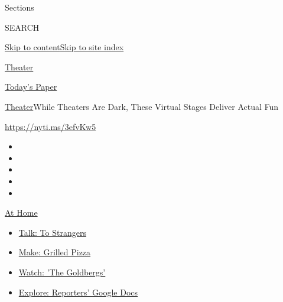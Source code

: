 Sections

SEARCH

\protect\hyperlink{site-content}{Skip to
content}\protect\hyperlink{site-index}{Skip to site index}

\href{https://www.nytimes3xbfgragh.onion/section/theater}{Theater}

\href{https://myaccount.nytimes3xbfgragh.onion/auth/login?response_type=cookie\&client_id=vi}{}

\href{https://www.nytimes3xbfgragh.onion/section/todayspaper}{Today's
Paper}

\href{/section/theater}{Theater}\textbar{}While Theaters Are Dark, These
Virtual Stages Deliver Actual Fun

\url{https://nyti.ms/3efvKw5}

\begin{itemize}
\item
\item
\item
\item
\item
\end{itemize}

\href{https://www.nytimes3xbfgragh.onion/spotlight/at-home?action=click\&pgtype=Article\&state=default\&region=TOP_BANNER\&context=at_home_menu}{At
Home}

\begin{itemize}
\tightlist
\item
  \href{https://www.nytimes3xbfgragh.onion/2020/08/03/well/family/the-benefits-of-talking-to-strangers.html?action=click\&pgtype=Article\&state=default\&region=TOP_BANNER\&context=at_home_menu}{Talk:
  To Strangers}
\item
  \href{https://www.nytimes3xbfgragh.onion/2020/08/01/at-home/coronavirus-make-pizza-on-a-grill.html?action=click\&pgtype=Article\&state=default\&region=TOP_BANNER\&context=at_home_menu}{Make:
  Grilled Pizza}
\item
  \href{https://www.nytimes3xbfgragh.onion/2020/07/31/arts/television/goldbergs-abc-stream.html?action=click\&pgtype=Article\&state=default\&region=TOP_BANNER\&context=at_home_menu}{Watch:
  'The Goldbergs'}
\item
  \href{https://www.nytimes3xbfgragh.onion/interactive/2020/at-home/even-more-reporters-editors-diaries-lists-recommendations.html?action=click\&pgtype=Article\&state=default\&region=TOP_BANNER\&context=at_home_menu}{Explore:
  Reporters' Google Docs}
\end{itemize}

